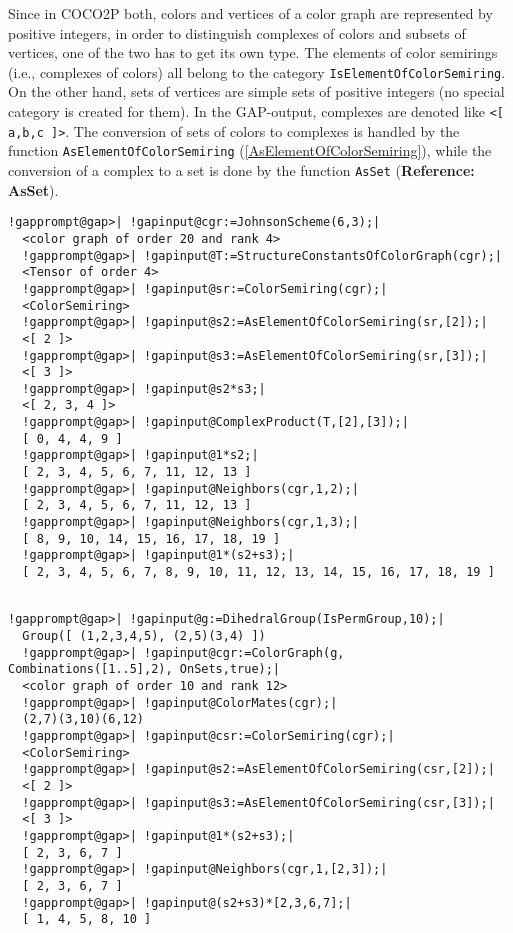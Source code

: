 \documentclass[a4paper,11pt]{report}
\begin{document}
{{ Since in \textsf{COCO2P} both, colors and vertices of a color graph are represented by positive
integers, in order to distinguish complexes of colors and subsets of vertices,
one of the two has to get its own type. The elements of color semirings (i.e.,
complexes of colors) all belong to the category \texttt{IsElementOfColorSemiring}. On the other hand, sets of vertices are simple sets of positive integers (no
special category is created for them). In the \textsf{GAP}-output, complexes are denoted like \texttt{{\textless}[ a,b,c ]{\textgreater}}. The conversion of sets of colors to complexes is handled by the function \texttt{AsElementOfColorSemiring} (\ref{AsElementOfColorSemiring}), while the conversion of a complex to a set is done by the function \texttt{AsSet} (\textbf{Reference: AsSet}). 
\begin{Verbatim}[commandchars=!@|,fontsize=\small,frame=single,label=Example]
  !gapprompt@gap>| !gapinput@cgr:=JohnsonScheme(6,3);|
  <color graph of order 20 and rank 4>
  !gapprompt@gap>| !gapinput@T:=StructureConstantsOfColorGraph(cgr);|
  <Tensor of order 4>
  !gapprompt@gap>| !gapinput@sr:=ColorSemiring(cgr);|
  <ColorSemiring>
  !gapprompt@gap>| !gapinput@s2:=AsElementOfColorSemiring(sr,[2]);|
  <[ 2 ]>
  !gapprompt@gap>| !gapinput@s3:=AsElementOfColorSemiring(sr,[3]);|
  <[ 3 ]>
  !gapprompt@gap>| !gapinput@s2*s3;|
  <[ 2, 3, 4 ]>
  !gapprompt@gap>| !gapinput@ComplexProduct(T,[2],[3]);|
  [ 0, 4, 4, 9 ]
  !gapprompt@gap>| !gapinput@1*s2;|
  [ 2, 3, 4, 5, 6, 7, 11, 12, 13 ]
  !gapprompt@gap>| !gapinput@Neighbors(cgr,1,2);|
  [ 2, 3, 4, 5, 6, 7, 11, 12, 13 ]
  !gapprompt@gap>| !gapinput@Neighbors(cgr,1,3);|
  [ 8, 9, 10, 14, 15, 16, 17, 18, 19 ]
  !gapprompt@gap>| !gapinput@1*(s2+s3);|
  [ 2, 3, 4, 5, 6, 7, 8, 9, 10, 11, 12, 13, 14, 15, 16, 17, 18, 19 ]
  	
\end{Verbatim}
 
\begin{Verbatim}[commandchars=!@|,fontsize=\small,frame=single,label=Example]
  !gapprompt@gap>| !gapinput@g:=DihedralGroup(IsPermGroup,10);|
  Group([ (1,2,3,4,5), (2,5)(3,4) ])
  !gapprompt@gap>| !gapinput@cgr:=ColorGraph(g, Combinations([1..5],2), OnSets,true);|
  <color graph of order 10 and rank 12>
  !gapprompt@gap>| !gapinput@ColorMates(cgr);|
  (2,7)(3,10)(6,12)
  !gapprompt@gap>| !gapinput@csr:=ColorSemiring(cgr);|
  <ColorSemiring>
  !gapprompt@gap>| !gapinput@s2:=AsElementOfColorSemiring(csr,[2]);|
  <[ 2 ]>
  !gapprompt@gap>| !gapinput@s3:=AsElementOfColorSemiring(csr,[3]);|
  <[ 3 ]>
  !gapprompt@gap>| !gapinput@1*(s2+s3);|
  [ 2, 3, 6, 7 ]
  !gapprompt@gap>| !gapinput@Neighbors(cgr,1,[2,3]);|
  [ 2, 3, 6, 7 ]
  !gapprompt@gap>| !gapinput@(s2+s3)*[2,3,6,7];|
  [ 1, 4, 5, 8, 10 ]
  	

\end{Verbatim}}}
\end{document}
